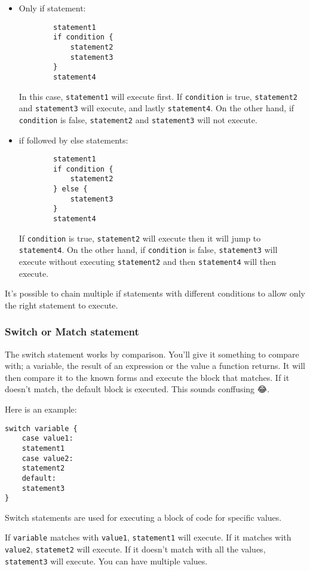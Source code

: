 \documentclass{book}
\begin{document}
\begin{itemize}
	\item Only if statement:

		\begin{verbatim}
		statement1
		if condition {
			statement2
			statement3
		}
		statement4
		\end{verbatim}

		In this case, \verb|statement1| will execute first. If \verb|condition| is true, \verb|statement2| and \verb|statement3| will execute, and lastly \verb|statement4|. On the other hand, if \verb|condition| is false, \verb|statement2| and \verb|statement3| will not execute.
	\item if followed by else statements:

		\begin{verbatim}
		statement1
		if condition {
			statement2
		} else {
			statement3
		}
		statement4
		\end{verbatim}

		If \verb|condition| is true, \verb|statement2| will execute then it will jump to \verb|statement4|. On the other hand, if \verb|condition| is false, \verb|statement3| will execute without executing \verb|statement2| and then \verb|statement4| will then execute.

\end{itemize}

It's possible to chain multiple if statements with different conditions to allow only the right statement to execute.

\subsubsection{Switch or Match statement}
The switch statement works by comparison. You'll give it something to compare with; a variable, the result of an expression or the value a function returns. It will then compare it to the known forms and execute the block that matches. If it doesn't match, the default block is executed. This sounds conffusing 😂.

Here is an example:

\begin{verbatim}
switch variable {
	case value1:
	statement1
	case value2:
	statement2
	default:
	statement3
}
\end{verbatim}

Switch statements are used for executing a block of code for specific values.

If \verb|variable| matches with \verb|value1|, \verb|statement1| will execute. If it matches with \verb|value2|, \verb|statemet2| will execute. If it doesn't match with all the values, \verb|statement3| will execute. You can have multiple values.
\end{document}
